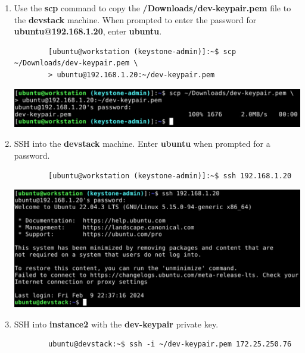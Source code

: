 \documentclass[letterpaper, 12pt]{article}
\begin{document}
\begin{enumerate}
    \item Use the \textbf{scp} command to copy the \textbf{\texttildemid/Downloads/dev-keypair.pem} file to the \textbf{devstack} machine.
    When prompted to enter the password for \textbf{ubuntu@192.168.1.20}, enter \textbf{ubuntu}.
    \begin{lstlisting}
        [ubuntu@workstation (keystone-admin)]:~$ scp ~/Downloads/dev-keypair.pem \
        > ubuntu@192.168.1.20:~/dev-keypair.pem
    \end{lstlisting}

    \begin{center}
        \includegraphics[width=\linewidth]{images/part3/step8.png}
    \end{center}

    \item SSH into the \textbf{devstack} machine.
    Enter \textbf{ubuntu} when prompted for a password.
    \begin{lstlisting}
        [ubuntu@workstation (keystone-admin)]:~$ ssh 192.168.1.20
    \end{lstlisting}

    \begin{center}
        \includegraphics[width=\linewidth]{images/part3/step9.png}
    \end{center}

    \item SSH into \textbf{instance2} with the \textbf{dev-keypair} private key.
    \begin{lstlisting}
        ubuntu@devstack:~$ ssh -i ~/dev-keypair.pem 172.25.250.76
    \end{lstlisting}


\end{enumerate}
\end{document}
